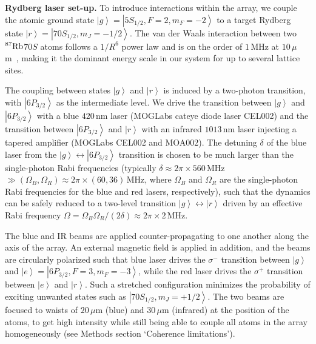 \documentclass[prl,nobalancelastpage,twocolumn,superscriptaddress,nofootinbib]{revtex4}
\newcommand{\ket}[1]{\left|#1\right\rangle}
\newcommand{\Rb}{\ensuremath{^{87}{\rm Rb}}\xspace}
\begin{document}
\begin{footnotesize}
\noindent
\textbf{Rydberg laser set-up.}
To introduce interactions within the array, we couple the atomic ground state
$\ket{g}=\ket{5S_{1/2}, F=2, m_F = -2}$ to a target Rydberg state
$\ket{r}=\ket{70S_{1/2}, m_J = -1/2}$. The van der Waals interaction between
two \Rb $70S$ atoms follows a $1/R^6$ power law and is on the order of $1\,$MHz
at $10\,\mu$m~\cite{Singer2005}, making it the dominant energy scale in our
system for up to several lattice sites.

The coupling between states $\ket{g}$ and $\ket{r}$ is induced by a two-photon
transition, with $\ket{6P_{3/2}}$ as the intermediate level. We drive the
transition between $\ket{g}$ and $\ket{6P_{3/2}}$ with a blue $420\,$nm laser
(MOGLabs cateye diode laser CEL002) and the transition between $\ket{6P_{3/2}}$
and $\ket{r}$ with an infrared $1013\,$nm laser injecting a tapered amplifier
(MOGLabs CEL002 and MOA002). The detuning $\delta$ of the blue laser from the
$\ket{g} \leftrightarrow \ket{6P_{3/2}}$ transition is chosen to be much larger
than the single-photon Rabi frequencies (typically $\delta\approx 2\pi \times
560\,$MHz $\gg (\Omega_B, \Omega_R) \approx 2\pi \times (60, 36)\,$MHz, where
$\Omega_{B}$ and $\Omega_{R}$ are the single-photon Rabi frequencies for the
blue and red lasers, respectively), such that the dynamics can be safely
reduced to a two-level transition $\ket{g} \leftrightarrow \ket{r}$ driven by
an effective Rabi frequency $\Omega=\Omega_{B} \Omega_{R}/(2\delta)\approx 2\pi
\times 2\,$MHz. 

The blue and IR beams are applied counter-propagating to one another along the
axis of the array. An external magnetic field is applied in addition, and the
beams are circularly polarized such that blue laser drives the $\sigma^{-}$
transition between $\ket{g}$ and $\ket{e}=\ket{6P_{3/2}, F=3, m_F = -3}$, while
the red laser drives the $\sigma^{+}$ transition between $\ket{e}$ and
$\ket{r}$. Such a stretched configuration minimizes the probability of exciting
unwanted states such as $\ket{70S_{1/2}, m_J = +1/2}$. The two beams are
focused to waists of $20\,\mu$m (blue) and $30\,\mu$m (infrared) at the position of
the atoms, to get high intensity while still being able to
couple all atoms in the array homogeneously (see Methods section `Coherence
limitations').


\end{footnotesize}
\end{document}
